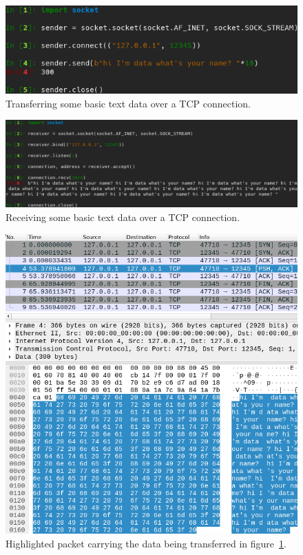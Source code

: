 \documentclass[titlepage]{article}
\begin{document}
\begin{figure}[H]
  \centering
  \includegraphics[width=\textwidth]{sender.png}
  \caption{%
    Transferring some basic text data over a TCP connection.
  }\label{sender}
\end{figure}

\begin{figure}[H]
  \centering
  \includegraphics[width=\textwidth]{receiver.png}
  \caption{%
    Receiving some basic text data over a TCP connection.
  }\label{receiver}
\end{figure}

\begin{figure}[H]
  \centering
  \includegraphics[width=\textwidth]{data.png}
  \caption{%
    Highlighted packet carrying the data being transferred in figure~\ref{sender}.
  }\label{data}
\end{figure}
\end{document}
